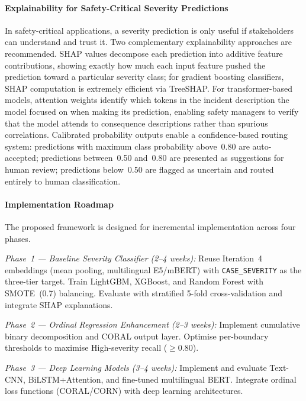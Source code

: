\documentclass[11pt, titlepage, bibliography=totoc]{scrreprt}
\begin{document}
\paragraph{Explainability for Safety-Critical Severity Predictions}
In safety-critical applications, a severity prediction is only useful if stakeholders can understand and trust it. Two complementary explainability approaches are recommended. SHAP values decompose each prediction into additive feature contributions, showing exactly how much each input feature pushed the prediction toward a particular severity class; for gradient boosting classifiers, SHAP computation is extremely efficient via TreeSHAP. For transformer-based models, attention weights identify which tokens in the incident description the model focused on when making its prediction, enabling safety managers to verify that the model attends to consequence descriptions rather than spurious correlations. Calibrated probability outputs enable a confidence-based routing system: predictions with maximum class probability above~0.80 are auto-accepted; predictions between~0.50 and~0.80 are presented as suggestions for human review; predictions below~0.50 are flagged as uncertain and routed entirely to human classification.

\paragraph{Implementation Roadmap}
The proposed framework is designed for incremental implementation across four phases.

\textit{Phase~1 --- Baseline Severity Classifier (2--4 weeks):} Reuse Iteration~4 embeddings (mean pooling, multilingual E5/mBERT) with \texttt{CASE\_SEVERITY} as the three-tier target. Train LightGBM, XGBoost, and Random Forest with SMOTE~(0.7) balancing. Evaluate with stratified 5-fold cross-validation and integrate SHAP explanations.

\textit{Phase~2 --- Ordinal Regression Enhancement (2--3 weeks):} Implement cumulative binary decomposition and CORAL output layer. Optimise per-boundary thresholds to maximise High-severity recall ($\geq 0.80$).

\textit{Phase~3 --- Deep Learning Models (3--4 weeks):} Implement and evaluate Text-CNN, BiLSTM+Attention, and fine-tuned multilingual BERT. Integrate ordinal loss functions (CORAL/CORN) with deep learning architectures.
\end{document}
